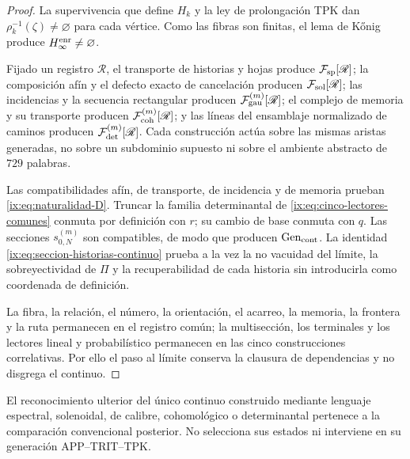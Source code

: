 \begin{proof}
La supervivencia que define \(H_k\) y la ley de prolongación TPK dan
\(\rho_k^{-1}(\zeta)\neq\varnothing\) para cada vértice. Como las fibras son
finitas, el lema de Kőnig produce \(H_\infty^{\rm enr}\neq\varnothing\).

Fijado un registro \(\mathscr R\), el transporte de historias y hojas produce
\(\mathcal F_{\rm sp}[\mathscr R]\); la composición afín y el defecto exacto
de cancelación producen \(\mathcal F_{\rm sol}[\mathscr R]\); las incidencias
y la secuencia rectangular producen \(\mathcal F_{\rm gau}^{(m)}[\mathscr R]\);
el complejo de memoria y su transporte producen
\(\mathcal F_{\rm coh}^{(m)}[\mathscr R]\); y las líneas del ensamblaje
normalizado de caminos producen \(\mathcal F_{\rm det}^{(m)}[\mathscr R]\).
Cada construcción actúa sobre las mismas aristas generadas, no sobre un
subdominio supuesto ni sobre el ambiente abstracto de \(729\) palabras.

Las compatibilidades afín, de transporte, de incidencia y de memoria prueban
\eqref{ix:eq:naturalidad-D}. Truncar la familia determinantal de
\eqref{ix:eq:cinco-lectores-comunes} conmuta por
definición con \(r\); su cambio de base conmuta con \(q\). Las secciones
\(s_{0,N}^{(m)}\) son compatibles, de modo que producen
\(\operatorname{Gen}_{\rm cont}\). La identidad
\eqref{ix:eq:seccion-historias-continuo} prueba a la vez la no
vacuidad del límite, la sobreyectividad de \(\Pi\) y la recuperabilidad de cada
historia sin introducirla como coordenada de definición.

La fibra, la relación, el número, la orientación, el acarreo, la memoria, la
frontera y la ruta permanecen en el registro común; la multisección, los
terminales y los lectores lineal y probabilístico permanecen en las cinco
construcciones correlativas. Por ello el paso al límite conserva la clausura de
dependencias y no disgrega el continuo.
\end{proof}

El reconocimiento ulterior del único continuo construido mediante lenguaje
espectral, solenoidal, de calibre, cohomológico o determinantal pertenece a la
comparación convencional posterior. No selecciona sus estados ni interviene en
su generación APP--TRIT--TPK.
